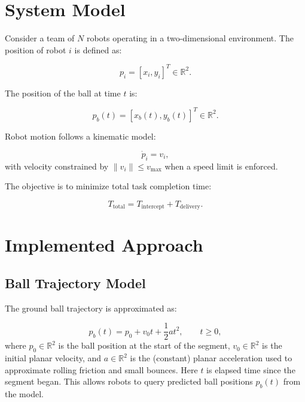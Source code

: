 \documentclass[conference]{IEEEtran}
\begin{document}
\section{System Model}

Consider a team of $N$ robots operating in a two-dimensional environment. The position of robot $i$ is defined as:

\begin{equation}
p_i = [x_i, y_i]^T \in \mathbb{R}^2 .
\end{equation}

The position of the ball at time $t$ is:

\begin{equation}
p_b(t) = [x_b(t), y_b(t)]^T \in \mathbb{R}^2 .
\end{equation}

Robot motion follows a kinematic model:

\begin{equation}
\dot{p}_i = v_i ,
\end{equation}
with velocity constrained by $\|v_i\| \le v_{\max}$ when a speed limit is enforced.

The objective is to minimize total task completion time:

\begin{equation}
T_{\mathrm{total}} = T_{\mathrm{intercept}} + T_{\mathrm{delivery}} .
\end{equation}

\section{Implemented Approach}

\subsection{Ball Trajectory Model}

The ground ball trajectory is approximated as:

\begin{equation}
p_b(t) = p_0 + v_0 t + \frac{1}{2} a t^2 , \qquad t \ge 0 ,
\end{equation}
where \(p_0 \in \mathbb{R}^2\) is the ball position at the start of the segment, \(v_0 \in \mathbb{R}^2\) is the initial planar velocity, and \(a \in \mathbb{R}^2\) is the (constant) planar acceleration used to approximate rolling friction and small bounces. Here \(t\) is elapsed time since the segment began. This allows robots to query predicted ball positions \(p_b(t)\) from the model.
\end{document}
